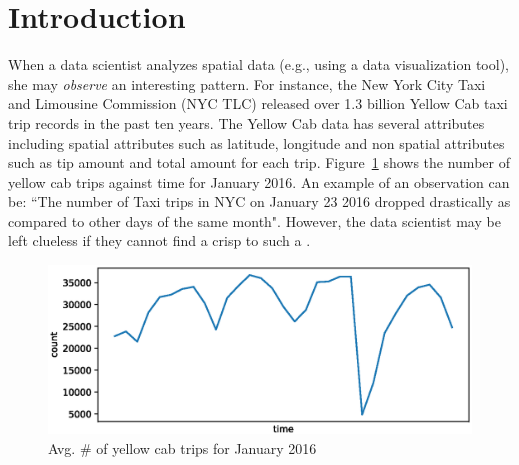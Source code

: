 \label{sec:Intro}
\section{Introduction}

When a data scientist analyzes spatial data (e.g., using a data visualization tool), she may {\em observe} an interesting pattern. 
For instance, the New York City Taxi and Limousine Commission (NYC TLC)\cite{taxi2016tlc} released over 1.3 billion Yellow Cab taxi trip records in the past ten years. The Yellow Cab data has several attributes including spatial attributes such as latitude, longitude and non spatial attributes such as tip amount and total amount for each trip. Figure~\ref{fig:yellowstats} shows the number of yellow cab trips against time for January 2016. 
An example of an observation can be: ``The number of Taxi trips in NYC on January 23 2016 dropped drastically as compared to other days of the same month". However, the data scientist may be left clueless if they cannot find a crisp {\explanation} to such a {\fact}. 
\begin{figure}[htp]
	\includegraphics[width=\columnwidth]{images/yellowdata_count.eps}
	\caption{Avg. \# of yellow cab trips for January 2016}
	\label{fig:yellowstats}
\end{figure}
